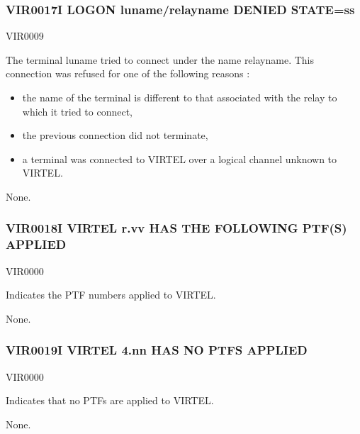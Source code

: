 \documentclass[letterpaper,10pt,english]{sphinxmanual}
\begin{document}
\subsubsection{VIR0017I LOGON luname/relayname DENIED STATE=ss}
\label{\detokenize{messages:vir0017i-logon-luname-relayname-denied-state-ss}}\begin{description}
\sphinxAtStartPar
VIR0009

\sphinxAtStartPar
The terminal luname tried to connect under the name relayname. This connection was refused for one of the following reasons :
\begin{itemize}
\item {} 
\sphinxAtStartPar
the name of the terminal is different to that associated with the relay to which it tried to connect,

\item {} 
\sphinxAtStartPar
the previous connection did not terminate,

\item {} 
\sphinxAtStartPar
a terminal was connected to VIRTEL over a logical channel unknown to VIRTEL.

\end{itemize}

\sphinxAtStartPar
None.

\end{description}


\subsubsection{VIR0018I VIRTEL r.vv HAS THE FOLLOWING PTF(S) APPLIED}
\label{\detokenize{messages:vir0018i-virtel-r-vv-has-the-following-ptf-s-applied}}\begin{description}
\sphinxAtStartPar
VIR0000

\sphinxAtStartPar
Indicates the PTF numbers applied to VIRTEL.

\sphinxAtStartPar
None.

\end{description}


\subsubsection{VIR0019I VIRTEL 4.nn HAS NO PTFS APPLIED}
\label{\detokenize{messages:vir0019i-virtel-4-nn-has-no-ptfs-applied}}\begin{description}
\sphinxAtStartPar
VIR0000

\sphinxAtStartPar
Indicates that no PTFs are applied to VIRTEL.

\sphinxAtStartPar
None.

\end{description}
\end{document}
